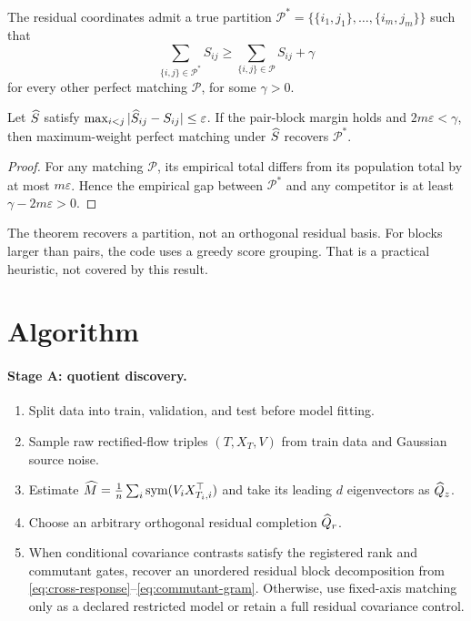 \begin{assumption}
The residual coordinates admit a true partition $\mathcal P^*=\{\{i_1,j_1\},\ldots,\{i_m,j_m\}\}$ such that
\begin{equation}
 \sum_{\{i,j\}\in\mathcal P^*}S_{ij}
 \ge \sum_{\{i,j\}\in\mathcal P}S_{ij}+\gamma
 \label{eq:matching-margin}
\end{equation}
for every other perfect matching $\mathcal P$, for some $\gamma>0$.
\end{assumption}

\begin{theorem}
Let $\widehat S$ satisfy $\max_{i<j}|\widehat S_{ij}-S_{ij}|\le\varepsilon$.  If the pair-block margin holds and $2m\varepsilon<\gamma$, then maximum-weight perfect matching under $\widehat S$ recovers $\mathcal P^*$.
\end{theorem}
\begin{proof}
For any matching $\mathcal P$, its empirical total differs from its population total by at most $m\varepsilon$.  Hence the empirical gap between $\mathcal P^*$ and any competitor is at least $\gamma-2m\varepsilon>0$.
\end{proof}

The theorem recovers a partition, not an orthogonal residual basis.  For blocks larger than pairs, the code uses a greedy score grouping.  That is a practical heuristic, not covered by this result.

\section{Algorithm}

\paragraph{Stage A: quotient discovery.}
\begin{enumerate}[leftmargin=*]
\item Split data into train, validation, and test before model fitting.
\item Sample raw rectified-flow triples $(T,X_T,V)$ from train data and Gaussian source noise.
\item Estimate $\widehat M=\frac1n\sum_i\operatorname{sym}(V_iX_{T_i,i}^\top)$ and take its leading $d$ eigenvectors as $\widehat Q_z$.
\item Choose an arbitrary orthogonal residual completion $\widehat Q_r$.
\item When conditional covariance contrasts satisfy the registered rank and commutant gates, recover an unordered residual block decomposition from \eqref{eq:cross-response}--\eqref{eq:commutant-gram}.  Otherwise, use fixed-axis matching only as a declared restricted model or retain a full residual covariance control.
\end{enumerate}

